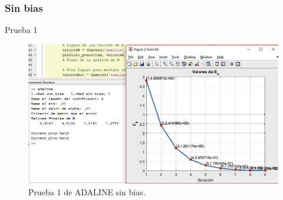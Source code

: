\documentclass[12pt, titlepage]{article}
\begin{document}
            \subsubsection{Sin bias}
            Prueba 1
            \begin{figure}[H]
                \begin{center}
                    \includegraphics[width=16cm]{img/adaline3/error.png}
                    \caption{Prueba 1 de ADALINE sin bias.}
                    \label{fig:adaline3error}
                \end{center}
            \end{figure}
            
\end{document}
